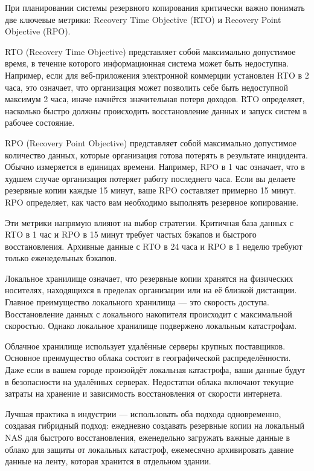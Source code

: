 \documentclass{SibFU-docs}
\begin{document}
\vspace{1em}


При планировании системы резервного копирования критически важно понимать две ключевые метрики: Recovery Time Objective (RTO) и Recovery Point Objective (RPO).

RTO (Recovery Time Objective) представляет собой максимально допустимое время, в течение которого информационная система может быть недоступна. Например, если для веб-приложения электронной коммерции установлен RTO в 2 часа, это означает, что организация может позволить себе быть недоступной максимум 2 часа, иначе начнётся значительная потеря доходов. RTO определяет, насколько быстро должны происходить восстановление данных и запуск систем в рабочее состояние.

RPO (Recovery Point Objective) представляет собой максимально допустимое количество данных, которые организация готова потерять в результате инцидента. Обычно измеряется в единицах времени. Например, RPO в 1 час означает, что в худшем случае организация потеряет работу последнего часа. Если вы делаете резервные копии каждые 15 минут, ваше RPO составляет примерно 15 минут. RPO определяет, как часто вам необходимо выполнять резервное копирование.

Эти метрики напрямую влияют на выбор стратегии. Критичная база данных с RTO в 1 час и RPO в 15 минут требует частых бэкапов и быстрого восстановления. Архивные данные с RTO в 24 часа и RPO в 1 неделю требуют только еженедельных бэкапов.


Локальное хранилище означает, что резервные копии хранятся на физических носителях, находящихся в пределах организации или на её близкой дистанции. Главное преимущество локального хранилища --- это скорость доступа. Восстановление данных с локального накопителя происходит с максимальной скоростью. Однако локальное хранилище подвержено локальным катастрофам.

Облачное хранилище использует удалённые серверы крупных поставщиков. Основное преимущество облака состоит в географической распределённости. Даже если в вашем городе произойдёт локальная катастрофа, ваши данные будут в безопасности на удалённых серверах. Недостатки облака включают текущие затраты на хранение и зависимость восстановления от скорости интернета.

Лучшая практика в индустрии --- использовать оба подхода одновременно, создавая гибридный подход: ежедневно создавать резервные копии на локальный NAS для быстрого восстановления, еженедельно загружать важные данные в облако для защиты от локальных катастроф, ежемесячно архивировать давние данные на ленту, которая хранится в отдельном здании.
\end{document}
